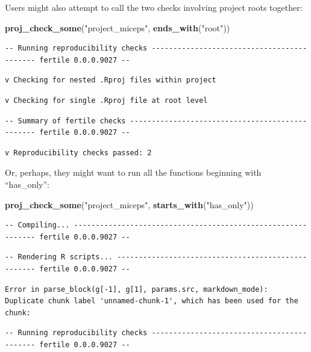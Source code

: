 \documentclass[12pt,twoside]{reedthesis}
\newenvironment{Shaded}{\begin{snugshade}}{\end{snugshade}}
\newcommand{\KeywordTok}[1]{\textcolor[rgb]{0.13,0.29,0.53}{\textbf{#1}}}
\newcommand{\StringTok}[1]{\textcolor[rgb]{0.31,0.60,0.02}{#1}}
\newcommand{\NormalTok}[1]{#1}
\begin{document}
Users might also attempt to call the two checks involving project roots
together:
\begin{Shaded}
\begin{Highlighting}[]
\KeywordTok{proj_check_some}\NormalTok{(}\StringTok{"project_miceps"}\NormalTok{, }\KeywordTok{ends_with}\NormalTok{(}\StringTok{"root"}\NormalTok{))}
\end{Highlighting}
\end{Shaded}
\begin{verbatim}
-- Running reproducibility checks ------------------------------------------- fertile 0.0.0.9027 --
\end{verbatim}
\begin{verbatim}
v Checking for nested .Rproj files within project
\end{verbatim}
\begin{verbatim}
v Checking for single .Rproj file at root level
\end{verbatim}
\begin{verbatim}
-- Summary of fertile checks ------------------------------------------------ fertile 0.0.0.9027 --
\end{verbatim}
\begin{verbatim}
v Reproducibility checks passed: 2
\end{verbatim}
Or, perhaps, they might want to run all the functions beginning with
``has\_only'':
\begin{Shaded}
\begin{Highlighting}[]
\KeywordTok{proj_check_some}\NormalTok{(}\StringTok{"project_miceps"}\NormalTok{, }\KeywordTok{starts_with}\NormalTok{(}\StringTok{"has_only"}\NormalTok{))}
\end{Highlighting}
\end{Shaded}
\begin{verbatim}
-- Compiling... ------------------------------------------------------------- fertile 0.0.0.9027 --
\end{verbatim}
\begin{verbatim}
-- Rendering R scripts... --------------------------------------------------- fertile 0.0.0.9027 --
\end{verbatim}
\begin{verbatim}
Error in parse_block(g[-1], g[1], params.src, markdown_mode): Duplicate chunk label 'unnamed-chunk-1', which has been used for the chunk:
\end{verbatim}
\begin{verbatim}
-- Running reproducibility checks ------------------------------------------- fertile 0.0.0.9027 --
\end{verbatim}
\end{document}
